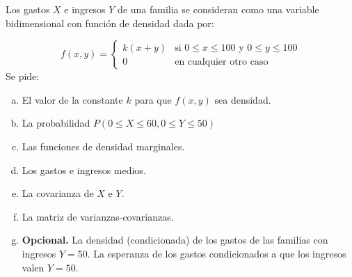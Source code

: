 \documentclass[12pt]{article}
\begin{document}
\begin{prob}
    Los gastos $X$  e ingresos $Y$ de una familia se consideran como una
    variable bidimensional con función de densidad dada por:


$$
f(x,y)=\left\{\begin{array}{ll} k (x+y)  & \mbox{si } 0\leq x \leq 100 \mbox{ y }  0\leq y
\leq 100\\ 0 & \mbox{en cualquier otro caso}
\end{array}\right.
$$
Se pide:
\begin{enumerate}[a)]
    \item El valor de la constante $k$ para que $f(x,y)$ sea densidad.
    \item La probabilidad $P(0\leq X\leq 60, 0\leq Y\leq 50)$
    \item Las funciones de densidad marginales.
    \item Los gastos e ingresos medios.
    \item La covarianza de $X$ e $Y$.
    \item La matriz de varianzas-covarianzas.
    \item \textbf{Opcional.} La densidad (condicionada) de los gastos
    de las familias con ingresos $Y=50$. La esperanza de los gastos
    condicionados a que los ingresos valen $Y=50$.
    \end{enumerate}

\end{prob}
\end{document}
